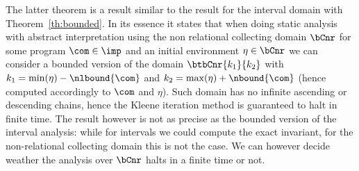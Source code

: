 The latter theorem is a result similar to the result for the interval
domain with Theorem~\ref{th:bounded}. In its essence it states that
when doing static analysis with abstract interpretation using the non
relational collecting domain \(\bCnr\) for some program
\(\com\in\imp\) and an initial environment \(\eta \in \bCnr\) we can
consider a bounded version of the domain \(\btbCnr{k_1}{k_2}\) with
\(k_1 = \min(\eta) - \nlbound{\com}\) and
\(k_2 = \max(\eta) + \nbound{\com}\) (hence computed accordingly to
\(\com\) and \(\eta\)). Such domain has no infinite ascending or
descending chains, hence the Kleene iteration method is guaranteed to
halt in finite time. The result however is not as precise as the
bounded version of the interval analysis: while for intervals we could
compute the exact invariant, for the non-relational collecting domain
this is not the case. We can however decide weather the analysis over
\(\bCnr\) halts in a finite time or not.
